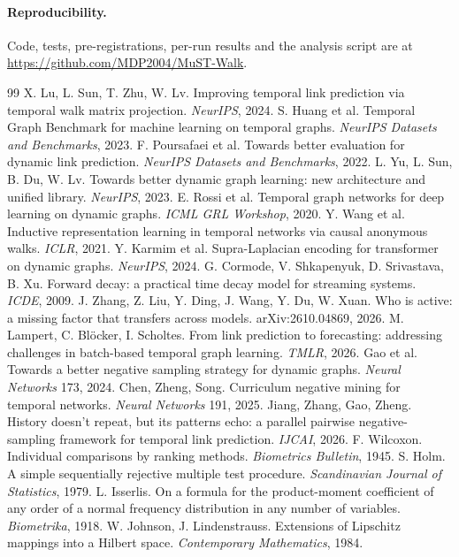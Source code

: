 \documentclass[11pt,a4paper]{article}
\theoremstyle{plain}
\theoremstyle{definition}
\newcommand{\repourl}{\url{https://github.com/MDP2004/MuST-Walk}}
\begin{document}
\paragraph{Reproducibility.} Code, tests, pre-registrations, per-run results and the analysis script are at \repourl.

\begin{thebibliography}{99}\small\itemsep1pt
 X. Lu, L. Sun, T. Zhu, W. Lv. Improving temporal link prediction via temporal walk matrix projection. \emph{NeurIPS}, 2024.
 S. Huang et al. Temporal Graph Benchmark for machine learning on temporal graphs. \emph{NeurIPS Datasets and Benchmarks}, 2023.
 F. Poursafaei et al. Towards better evaluation for dynamic link prediction. \emph{NeurIPS Datasets and Benchmarks}, 2022.
 L. Yu, L. Sun, B. Du, W. Lv. Towards better dynamic graph learning: new architecture and unified library. \emph{NeurIPS}, 2023.
 E. Rossi et al. Temporal graph networks for deep learning on dynamic graphs. \emph{ICML GRL Workshop}, 2020.
 Y. Wang et al. Inductive representation learning in temporal networks via causal anonymous walks. \emph{ICLR}, 2021.
 Y. Karmim et al. Supra-Laplacian encoding for transformer on dynamic graphs. \emph{NeurIPS}, 2024.
 G. Cormode, V. Shkapenyuk, D. Srivastava, B. Xu. Forward decay: a practical time decay model for streaming systems. \emph{ICDE}, 2009.
 J. Zhang, Z. Liu, Y. Ding, J. Wang, Y. Du, W. Xuan. Who is active: a missing factor that transfers across models. arXiv:2610.04869, 2026.
 M. Lampert, C. Bl\"ocker, I. Scholtes. From link prediction to forecasting: addressing challenges in batch-based temporal graph learning. \emph{TMLR}, 2026.
 Gao et al. Towards a better negative sampling strategy for dynamic graphs. \emph{Neural Networks} 173, 2024.
 Chen, Zheng, Song. Curriculum negative mining for temporal networks. \emph{Neural Networks} 191, 2025.
 Jiang, Zhang, Gao, Zheng. History doesn't repeat, but its patterns echo: a parallel pairwise negative-sampling framework for temporal link prediction. \emph{IJCAI}, 2026.
 F. Wilcoxon. Individual comparisons by ranking methods. \emph{Biometrics Bulletin}, 1945.
 S. Holm. A simple sequentially rejective multiple test procedure. \emph{Scandinavian Journal of Statistics}, 1979.
 L. Isserlis. On a formula for the product-moment coefficient of any order of a normal frequency distribution in any number of variables. \emph{Biometrika}, 1918.
 W. Johnson, J. Lindenstrauss. Extensions of Lipschitz mappings into a Hilbert space. \emph{Contemporary Mathematics}, 1984.
\end{thebibliography}
\end{document}
